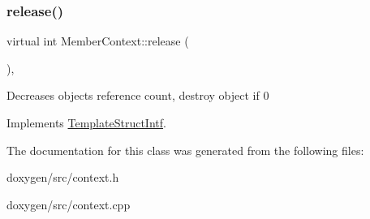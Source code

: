 \subsubsection{\texorpdfstring{release()}{release()}}
{\footnotesize\ttfamily virtual int Member\+Context\+::release (\begin{DoxyParamCaption}{ }\end{DoxyParamCaption})\hspace{0.3cm}{\ttfamily [inline]}, {\ttfamily [virtual]}}

Decreases object\textquotesingle{}s reference count, destroy object if 0 

Implements \mbox{\hyperlink{class_template_struct_intf_a3dce7dd29d3f66a8080b40578e8a5045}{Template\+Struct\+Intf}}.



The documentation for this class was generated from the following files\+:\begin{DoxyCompactItemize}
\item 
doxygen/src/context.\+h\item 
doxygen/src/context.\+cpp\end{DoxyCompactItemize}
